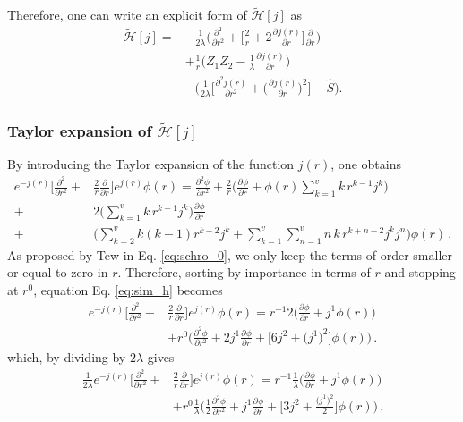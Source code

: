 \documentclass[aip,jcp,reprint,noshowkeys,superscriptaddress]{revtex4-1}
\newcommand{\deriv}[3]{\frac{\partial^{#3} #1}{\partial {#2}^{#3}}}
\begin{document}
Therefore, one can write an explicit form of $\tilde{\mathcal{H}}[j]$ as 
\begin{equation}
 \label{def:htilde}
 \begin{aligned}
 \tilde{\mathcal{H}}[j] = & - \frac{1}{2\lambda} \bigg( \deriv{}{r}{2} + \bigg[ \frac{2}{r}+  2 \deriv{j(r)}{r}{}\bigg] \deriv{}{r}{} \bigg) \\
 & + \frac{1}{r} \bigg( Z_1 Z_2 - \frac{1}{\lambda}  \deriv{j(r)}{r}{} \bigg) \\
 &- \bigg( \frac{1}{2\lambda}\bigg[ \deriv{j(r)}{r}{2} + \bigg(\deriv{j(r)}{r}{}\bigg)^2\bigg] - \hat{S} \bigg). 
 \end{aligned}
\end{equation}

\subsubsection{Taylor expansion of $\tilde{\mathcal{H}}[j]$}
By introducing the Taylor expansion of the function $j(r)$, one obtains 
\begin{equation}
 \label{eq:sim_h}
 \begin{aligned}
 e^{-j(r)} \bigg[ \deriv{}{r}{2} + & \frac{2}{r} \deriv{}{r}{}\bigg]  e^{j(r)} \phi(r) = \deriv{\phi}{r}{2} + \frac{2}{r}\bigg( \deriv{\phi}{r}{} + \phi(r)\sum_{k=1}^v k\, r^{k-1} j^k \bigg) \\
 + & 2 \bigg( \sum_{k=1}^v k \, r^{k-1} j^k  \bigg) \deriv{\phi}{r}{} \\
 + & \bigg(\sum_{k=2}^v k(k-1) r^{k-2} j^k + \sum_{k=1}^v\sum_{n=1}^v n \, k \, r^{k+n-2} j^k j^n\bigg)\phi(r) \, .
 \end{aligned}
\end{equation}
As proposed by Tew in Eq. \eqref{eq:schro_0}, we only keep the terms of order smaller or equal to zero in $r$. 
Therefore, sorting by importance in terms of $r$ and stopping at $r^0$, equation Eq. \eqref{eq:sim_h} becomes
\begin{equation}
 \label{eq:sim_kin_1}
 \begin{aligned}
 e^{-j(r)} \bigg[ \deriv{}{r}{2} + & \frac{2}{r} \deriv{}{r}{}\bigg]  e^{j(r)} \phi(r) =  r^{-1} 2 \bigg( \deriv{\phi}{r}{} + j^1 \phi(r)\bigg)\\
& + r^0 \bigg( \deriv{\phi}{r}{2} + 2 j^1 \deriv{\phi}{r}{} + \bigg[  6 j^2  + \big(j^1\big)^2\bigg] \phi(r) \bigg) \, .
 \end{aligned}
\end{equation}
which, by dividing by $2\lambda$ gives
\begin{equation}
 \label{eq:sim_kin_2}
 \begin{aligned}
 \frac{1}{2\lambda}e^{-j(r)} \bigg[ \deriv{}{r}{2} + & \frac{2}{r} \deriv{}{r}{}\bigg]  e^{j(r)} \phi(r) =  r^{-1} \frac{1}{\lambda}\bigg( \deriv{\phi}{r}{} + j^1 \phi(r)\bigg)\\
& + r^0 \frac{1}{\lambda}\bigg( \frac{1}{2}\deriv{\phi}{r}{2} + j^1 \deriv{\phi}{r}{} + \bigg[  3 j^2  + \frac{\big(j^1\big)^2}{2}\bigg] \phi(r) \bigg) \, .
 \end{aligned}
\end{equation}
\end{document}
